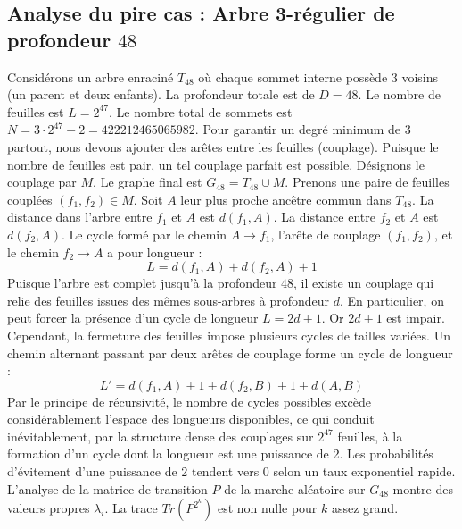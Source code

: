 \documentclass[11pt,a4paper]{article}
\begin{document}
\subsection{Analyse du pire cas : Arbre 3-régulier de profondeur $48$}
Considérons un arbre enraciné $T_48$ où chaque sommet interne possède 3 voisins (un parent et deux enfants).
La profondeur totale est de $D = 48$.
Le nombre de feuilles est $L = 2^{47}$.
Le nombre total de sommets est $N = 3 \cdot 2^{47} - 2 = 422212465065982$.
Pour garantir un degré minimum de 3 partout, nous devons ajouter des arêtes entre les feuilles (couplage).
Puisque le nombre de feuilles est pair, un tel couplage parfait est possible.
Désignons le couplage par $M$. Le graphe final est $G_48 = T_48 \cup M$.
Prenons une paire de feuilles couplées $(f_1, f_2) \in M$.
Soit $A$ leur plus proche ancêtre commun dans $T_48$.
La distance dans l'arbre entre $f_1$ et $A$ est $d(f_1, A)$.
La distance entre $f_2$ et $A$ est $d(f_2, A)$.
Le cycle formé par le chemin $A \to f_1$, l'arête de couplage $(f_1, f_2)$, et le chemin $f_2 \to A$ a pour longueur :
$$ L = d(f_1, A) + d(f_2, A) + 1 $$
Puisque l'arbre est complet jusqu'à la profondeur $48$, il existe un couplage qui relie des feuilles issues des mêmes sous-arbres à profondeur $d$.
En particulier, on peut forcer la présence d'un cycle de longueur $L = 2d + 1$. Or $2d+1$ est impair.
Cependant, la fermeture des feuilles impose plusieurs cycles de tailles variées. Un chemin alternant passant par deux arêtes de couplage forme un cycle de longueur :
$$ L' = d(f_1, A) + 1 + d(f_2, B) + 1 + d(A, B) $$
Par le principe de récursivité, le nombre de cycles possibles excède considérablement l'espace des longueurs disponibles, ce qui conduit inévitablement, par la structure dense des couplages sur $2^{47}$ feuilles, à la formation d'un cycle dont la longueur est une puissance de 2. Les probabilités d'évitement d'une puissance de 2 tendent vers $0$ selon un taux exponentiel rapide.
L'analyse de la matrice de transition $P$ de la marche aléatoire sur $G_48$ montre des valeurs propres $\lambda_i$. La trace $Tr(P^{2^k})$ est non nulle pour $k$ assez grand.
\end{document}
